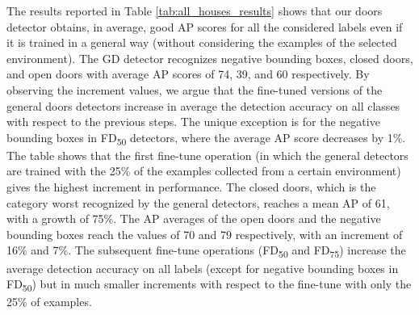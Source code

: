 The results reported in Table \ref{tab:all_houses_results} shows that our doors detector obtains, in average, good AP scores for all the considered labels even if it is trained in a general way (without considering the examples of the selected environment). The \textsf{GD} detector recognizes negative bounding boxes, closed doors, and open doors with average AP scores of 74, 39, and 60 respectively. By observing the increment values, we argue that the fine-tuned versions of the general doors detectors increase in average the detection accuracy on all classes with respect to the previous steps. The unique exception is for the negative bounding boxes in \textsf{FD\textsubscript{50}} detectors, where the average AP score decreases by 1\%.  The table shows that the first fine-tune operation (in which the general detectors are trained with the 25\% of the examples collected from a certain environment) gives the highest increment in performance. The closed doors, which is the category worst recognized by the general detectors, reaches a mean AP of 61, with a growth of 75\%. The AP averages of the open doors and the negative bounding boxes reach the values of 70 and 79 respectively, with an increment of 16\% and 7\%. The subsequent fine-tune operations (\textsf{FD\textsubscript{50}} and \textsf{FD\textsubscript{75}}) increase the average detection accuracy on all labels (except for negative bounding boxes in \textsf{FD\textsubscript{50}}) but in much smaller increments with respect to the fine-tune with only the 25\% of examples. 

